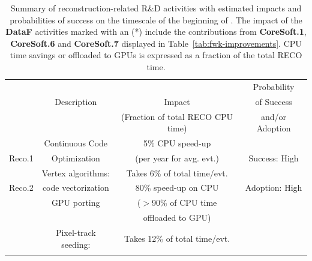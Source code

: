 \begin{table}[tbph]
    \centering
    \caption{Summary of reconstruction-related R\&D activities with estimated impacts and probabilities of success on the timescale of the beginning of \RunFour. The impact of the \textbf{DataF} activities marked with an (*) include the contributions from \textbf{CoreSoft.1}, \textbf{CoreSoft.6} and \textbf{CoreSoft.7} displayed in Table~\ref{tab:fwk-improvements}. \gls{CPU} time savings or offloaded to \glspl{GPU} is expressed as a fraction of the total \gls{RECO} time.}
    \begin{tabular}{|c|c|c|c|}
    \hline
    \rowcolor{tableheader} 
              &                                  &                                                   & Probability      \\ 
    \rowcolor{tableheader}
              & Description                      &       Impact                                      & of Success       \\ 
    \rowcolor{tableheader}
              &                                  &   (Fraction of total RECO CPU time)   & and/or Adoption  \\ \hline
    \cellcolor{tablerowheader}
              & Continuous Code                  & 5\% CPU speed-up                             &                  \\
    \cellcolor{tablerowheader}
    Reco.1    & Optimization                     & (per year for avg. evt.)                          & Success: High    \\ \hline
    \cellcolor{tablerowheader}
              & Vertex algorithms:               & Takes 6\% of total time/evt.                      &                  \\
    \cellcolor{tablerowheader}
    Reco.2    & {code vectorization }            & 80\% {speed-up on CPU}                       & Adoption: High   \\
    \cellcolor{tablerowheader}
              & {GPU porting}              &     {($>$90\% of CPU time }                 &                  \\ 
    \cellcolor{tablerowheader}
              &                                  &  offloaded to GPU)                        &                  \\ \hline
    \cellcolor{tablerowheader}
              & Pixel-track seeding:             & Takes 12\% of total time/evt.                     &                  \\
    \cellcolor{tablerowheader}

\end{tabular}
\end{table}
